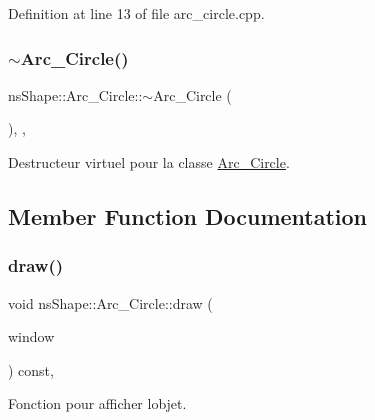 Definition at line 13 of file arc\+\_\+circle.\+cpp.

\mbox{\label{classns_shape_1_1_arc___circle_a8b53fe0e24f1d0b1ad47331b8c66d289}} 
\subsubsection{\texorpdfstring{$\sim$\+Arc\+\_\+\+Circle()}{~Arc\_Circle()}}
{\footnotesize\ttfamily ns\+Shape\+::\+Arc\+\_\+\+Circle\+::$\sim$\+Arc\+\_\+\+Circle (\begin{DoxyParamCaption}{ }\end{DoxyParamCaption})\hspace{0.3cm}{\ttfamily [override]}, {\ttfamily [virtual]}, {\ttfamily [default]}}



Destructeur virtuel pour la classe \hyperlink{classns_shape_1_1_arc___circle}{Arc\+\_\+\+Circle}. 



\subsection{Member Function Documentation}
\mbox{\label{classns_shape_1_1_arc___circle_a1e789ca962aeefd7dfd861eb0f75a6d7}} 
\subsubsection{\texorpdfstring{draw()}{draw()}}
{\footnotesize\ttfamily void ns\+Shape\+::\+Arc\+\_\+\+Circle\+::draw (\begin{DoxyParamCaption}\item[{\hyperlink{class_min_g_l}{Min\+GL} \&}]{window }\end{DoxyParamCaption}) const\hspace{0.3cm}{\ttfamily [override]}, {\ttfamily [virtual]}}



Fonction pour afficher l\textquotesingle{}objet. 



